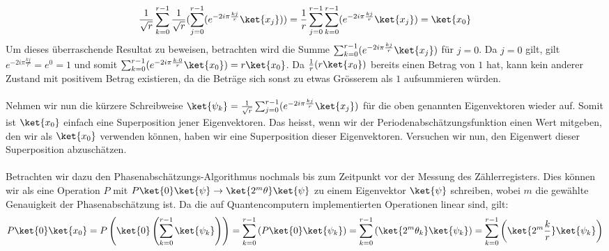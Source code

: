 \begin{align*}
    \frac{1}{\sqrt{r}}\sum_{k = 0}^{r - 1}\frac{1}{\sqrt{r}}(\sum_{j = 0}^{r - 1}(e^{-2i\pi\frac{kj}{r}}\ket{x_j})) = \frac{1}{r}\sum_{j = 0}^{r - 1}\sum_{k = 0}^{r - 1}(e^{-2i\pi\frac{kj}{r}}\ket{x_j}) = \ket{x_0}
\end{align*}
Um dieses überraschende Resultat zu beweisen, betrachten wird die Summe $\sum_{k = 0}^{r - 1}(e^{-2i\pi\frac{kj}{r}}\ket{x_j})$ für $j = 0$. Da $j = 0$ gilt, gilt $e^{-2i\pi\frac{kj}{r}} = e^{0} = 1$ und somit $\sum_{k = 0}^{r - 1}(e^{-2i\pi\frac{k\cdot 0}{r}}\ket{x_0}) = r\ket{x_0}$. Da $\frac{1}{r}(r\ket{x_0})$ bereits einen Betrag von $1$ hat, kann kein anderer Zustand mit positivem Betrag existieren, da die Beträge sich sonst zu etwas Grösserem als $1$ aufsummieren würden.

\paragraph{}

Nehmen wir nun die kürzere Schreibweise $\ket{\psi_k} = \frac{1}{\sqrt{r}}\sum_{j = 0}^{r - 1}(e^{-2i\pi\frac{kj}{r}}\ket{x_j})$ für die oben genannten Eigenvektoren wieder auf. Somit ist $\ket{x_0}$ einfach eine Superposition jener Eigenvektoren. Das heisst, wenn wir der Periodenabschätzungsfunktion einen Wert mitgeben, den wir als $\ket{x_0}$ verwenden können, haben wir eine Superposition dieser Eigenvektoren. Versuchen wir nun, den Eigenwert dieser Superposition abzuschätzen.

\paragraph{}
Betrachten wir dazu den Phasenabschätzungs-Algorithmus nochmals bis zum Zeitpunkt vor der Messung des Zählerregisters. Dies können wir als eine Operation $P$ mit $P\ket{0}\ket{\psi} \rightarrow \ket{2^m\theta}\ket{\psi}$ zu einem Eigenvektor $\ket{\psi}$ schreiben, wobei $m$ die gewählte Genauigkeit der Phasenabschätzung ist. Da die auf Quantencomputern implementierten Operationen linear sind, gilt: $$P\ket{0}\ket{x_0} = P\left(\ket{0}\left(\sum_{k = 0}^{r - 1}\ket{\psi_k}\right)\right) = \sum_{k = 0}^{r - 1}\left(P\ket{0}\ket{\psi_k}\right) = \sum_{k = 0}^{r - 1}\left(\ket{2^m\theta_k}\ket{\psi_k}\right) = \sum_{k = 0}^{r - 1}\left(\ket{2^m\frac{k}{r}}\ket{\psi_k}\right)$$

